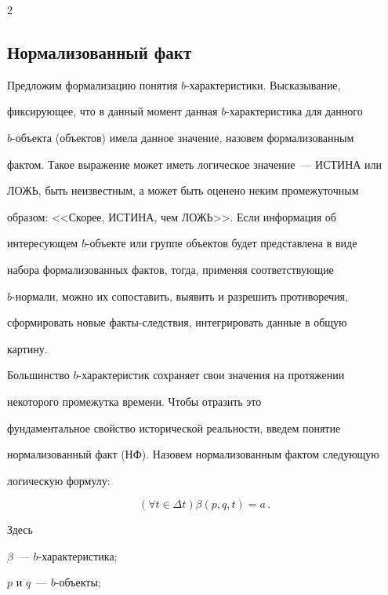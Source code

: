 \begin{multicols}{2}
\subsection{Нормализованный факт}


 


  Предложим формализацию понятия $b$-ха\-рак\-те\-ри\-сти\-ки. Высказывание, 


фиксирующее, что в данный момент данная $b$-характеристика для данного 


  $b$-объекта (объектов) имела данное значение, назовем формализованным 


фактом. Такое выражение может иметь логическое значение~--- ИСТИНА или 


ЛОЖЬ, быть неизвестным, а может быть оценено неким промежуточным 


образом: <<Скорее, ИСТИНА, чем ЛОЖЬ>>. Если информация об 


интересующем $b$-объекте или группе объектов будет представлена в виде 


набора формализованных фактов, тогда, применяя соответствующие 


  $b$-нормали, можно их сопоставить, выявить и разрешить противоречия, 


сформировать новые факты-следствия, интегрировать данные в общую 


картину.


  


  Большинство $b$-характеристик сохраняет свои значения на протяжении 


некоторого промежутка времени.  Чтобы отразить это 


фундаментальное свойство исторической реальности, введем понятие 


нормализованный факт (НФ). Назовем нормализованным фактом  следующую 


логическую формулу:


  \begin{equation}


  \left( \forall t\in \Delta t\right) \beta(p,q,t)=a\,.


  \label{e1mar}


  \end{equation}


  Здесь 


  $\beta$~--- $b$-характеристика;


  $p$ и $q$~--- $b$-объекты;



\end{multicols}
